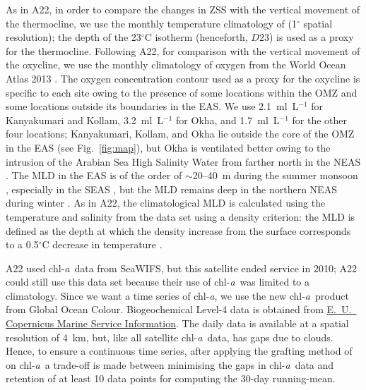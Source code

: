 \documentclass[authoryear,review,11pt]{elsarticle}
\newcommand{\chla}{chl-{\emph{a}}}
\begin{document}
As in A22, in order to compare the changes in ZSS with the vertical movement of the thermocline, we use the monthly temperature climatology of \citet{chatterjee2012new} (1$^{\circ}$ spatial resolution); the depth of the 23$^{\circ}$C isotherm (henceforth, $D23$) is used as a proxy for the thermocline. Following A22, for comparison with the vertical movement of the oxycline, we use the monthly climatology of oxygen from the World Ocean Atlas 2013 \citep{garcia2013oxygen}.  The oxygen concentration contour used as a proxy for the oxycline is specific to each site owing to the presence of some locations within the OMZ and some locations outside its boundaries in the EAS. We use 2.1~ml~L$^{-1}$ for Kanyakumari and Kollam, 3.2~ml~L$^{-1}$ for Okha, and 1.7~ml~L$^{-1}$ for the other four locations; Kanyakumari, Kollam, and Okha lie outside the core of the OMZ in the EAS (see Fig.~\ref{fig:map}), but Okha is ventilated better owing to the intrusion of the Arabian Sea High Salinity Water \citep[ASHSW;][]{rochford1964salinity, wyrtki1971oceanographic} from farther north in the NEAS \citep{banse2009wintertime, naqvi2006coastal, shankar2016inhibition}. The MLD in the EAS is of the order of $\sim$20--40~m during the summer monsoon \citep{shetye1990hydrography, shankar2002hydrography, sreenivas2008monthly}, especially in the SEAS \citep{shenoi2005hydrography}, but the MLD remains deep in the northern NEAS during winter \citep{shankar2016inhibition}. As in A22, the climatological MLD is calculated using the temperature and salinity from the \citet{chatterjee2012new} data set using a density criterion: the MLD is defined as the depth at which the density increase from the surface corresponds to a 0.5$^\circ$C decrease in temperature \citep{shenoi2004remote}. 

A22 used \chla\ data from SeaWIFS, but this satellite ended service in 2010; A22 could still use this data set because their use of \chla\ was limited to a climatology.  Since we want a time series of \chla, we use the new \chla\ product from Global Ocean Colour. Biogeochemical Level-4 data is obtained from \href{https://doi.org/10.48670/moi-00281}{E.~U.~ Copernicus Marine Service Information}. The daily data is available at a spatial resolution of 4~km, but, like all satellite \chla\ data, has gaps due to clouds. Hence, to ensure a continuous time series, after applying the grafting method of \citet{mukhopadhyay2017st} on \chla\, a trade-off is made between minimising the gaps in \chla\ data and retention of at least 10 data points for computing the 30-day running-mean.
\end{document}
